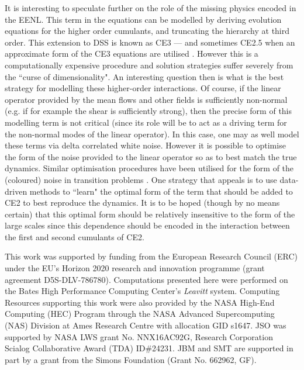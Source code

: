 \documentclass{jfm}
\begin{document}
It is interesting to speculate further on the role of the missing physics encoded in the EENL. This term in the equations can be modelled by deriving evolution equations for the higher order cumulants, and truncating the hierarchy at third order. This extension to DSS is known as CE3 --- and sometimes CE2.5 when an approximate form of the CE3 equations are utilised \citep{marston_qi_tobias_2019}. However this is a computationally expensive procedure and solution strategies suffer severely from the ``curse of dimensionality". An interesting question then is what is the best strategy for modelling these higher-order interactions. Of course, if the linear operator provided by the mean flows and other fields is sufficiently non-normal (e.g. if for example the shear is sufficiently strong), then the precise form of this modelling term is not critical (since its role will be to act as a driving term for the non-normal modes of the linear operator). In this case, one may as well model these terms via delta correlated white noise. However it is possible to optimise the form of the noise provided to the linear operator so as to best match the true dynamics. Similar optimisation procedures have been utilised for the form of the (coloured) noise in transition problems \citep[][]{zjg_2017}. One strategy that appeals is to use data-driven methods to ``learn" the optimal form of the term that should be added to CE2 to best reproduce the dynamics. It is to be hoped (though by no means certain) that this optimal form should be relatively insensitive to the form of the large scales since this dependence should be encoded in the interaction between the first and second cumulants of CE2.   


\bigskip


This work was supported by funding from the European Research Council (ERC) under the EU’s Horizon 2020 research and innovation programme (grant agreement D5S-DLV-786780). Computations presented here were performed on the Bates High Performance Computing Center's \emph{Leavitt} system. Computing Resources supporting this work were also provided by the NASA High-End Computing (HEC) Program through the NASA Advanced Supercomputing (NAS) Division at Ames Research Centre with allocation GID s1647.
JSO was supported by NASA LWS grant No. NNX16AC92G, Research Corporation Scialog Collaborative Award (TDA) ID\#24231. JBM and SMT are supported in part by a grant from the Simons Foundation (Grant No. 662962, GF).
\end{document}
